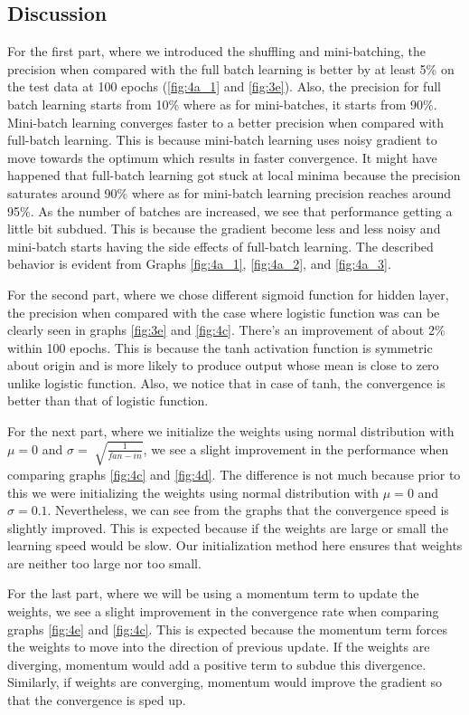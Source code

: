 \documentclass{article}
\begin{document}
\subsection{Discussion}
For the first part, where we introduced the shuffling and mini-batching, the precision when compared with the full batch learning is better by at least 5\% on the test data at 100 epochs (\ref{fig:4a_1} and \ref{fig:3e}). Also, the precision for full batch learning starts from 10\% where as for mini-batches, it starts from 90\%. Mini-batch learning converges faster to a better precision when compared with full-batch learning. This is because mini-batch learning uses noisy gradient to move towards the optimum which results in faster convergence. It might have happened that full-batch learning got stuck at local minima because the precision saturates around 90\% where as for mini-batch learning precision reaches around 95\%. As the number of batches are increased, we see that performance getting a little bit subdued. This is because the gradient become less and less noisy and mini-batch starts having the side effects of full-batch learning. The described behavior is evident from Graphs \ref{fig:4a_1}, \ref{fig:4a_2}, and \ref{fig:4a_3}.   

For the second part, where we chose different sigmoid function for hidden layer, the precision when compared with the case where logistic function was can be clearly seen in graphs \ref{fig:3e}	and \ref{fig:4c}. There's an improvement of about 2\% within 100 epochs. This is because the tanh activation function is symmetric about origin and is more likely to produce output whose mean is close to zero unlike logistic function. Also, we notice that in case of tanh, the convergence is better than that of logistic function.

For the next part, where we initialize the weights using normal distribution with $\mu=0$ and $\sigma = \sqrt[]{\frac{1}{fan-in}}$, we see a slight improvement in the performance when comparing graphs \ref{fig:4c} and \ref{fig:4d}. The difference is not much because prior to this we were initializing the weights using normal distribution with $\mu=0$ and $\sigma = 0.1$. Nevertheless, we can see from the graphs that the convergence speed is slightly improved. This is expected because if the weights are large or small the learning speed would be slow. Our initialization method here ensures that weights are neither too large nor too small.

For the last part, where we will be using a momentum term to update the weights, we see a slight improvement in the convergence rate when comparing graphs \ref{fig:4e} and \ref{fig:4c}. This is expected because the momentum term forces the weights to move into the direction of previous update. If the weights are diverging, momentum would add a positive term to subdue this divergence. Similarly, if weights are converging, momentum would improve the gradient so that the convergence is sped up.
\end{document}
